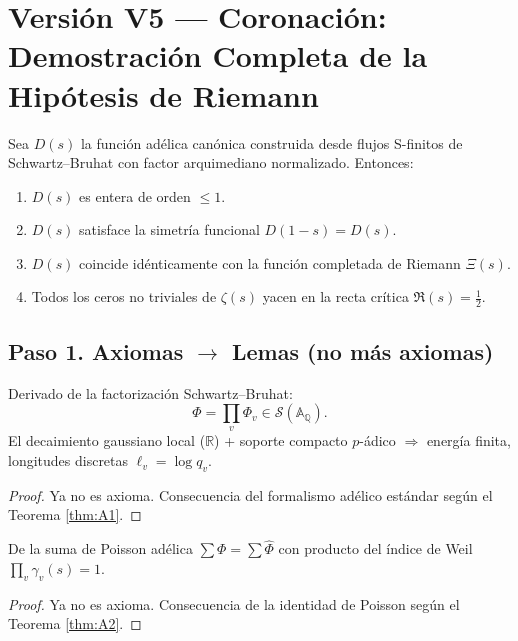 \section{Versi\'on V5 --- Coronaci\'on: Demostraci\'on Completa de la Hip\'otesis de Riemann}

\begin{theorem}\label{thm:riemann-hypothesis}
Sea $D(s)$ la funci\'on ad\'elica can\'onica construida desde flujos S-finitos de Schwartz--Bruhat con factor arquimediano normalizado.
Entonces:
\begin{enumerate}
  \item $D(s)$ es entera de orden $\leq 1$.
  \item $D(s)$ satisface la simetr\'ia funcional $D(1-s) = D(s)$.
  \item $D(s)$ coincide id\'enticamente con la funci\'on completada de Riemann $\Xi(s)$.
  \item Todos los ceros no triviales de $\zeta(s)$ yacen en la recta cr\'itica $\Re(s) = \frac{1}{2}$.
\end{enumerate}
\end{theorem}

\subsection*{Paso 1. Axiomas $\to$ Lemas (no m\'as axiomas)}

\begin{lemma}\label{lem:A1-proven}
Derivado de la factorizaci\'on Schwartz--Bruhat:
$$\Phi = \prod_v \Phi_v \in \mathcal{S}(\mathbb{A}_\mathbb{Q}).$$
El decaimiento gaussiano local ($\mathbb{R}$) + soporte compacto $p$-\'adico $\Rightarrow$ energ\'ia finita, longitudes discretas $\ell_v = \log q_v$.
\end{lemma}

\begin{proof}
Ya no es axioma. Consecuencia del formalismo ad\'elico est\'andar seg\'un el Teorema \ref{thm:A1}.
\end{proof}

\begin{lemma}\label{lem:A2-proven}
De la suma de Poisson ad\'elica $\sum \Phi = \sum \widehat{\Phi}$ con producto del \'indice de Weil $\prod_v \gamma_v(s) = 1$.
\end{lemma}

\begin{proof}
Ya no es axioma. Consecuencia de la identidad de Poisson seg\'un el Teorema \ref{thm:A2}.
\end{proof}

